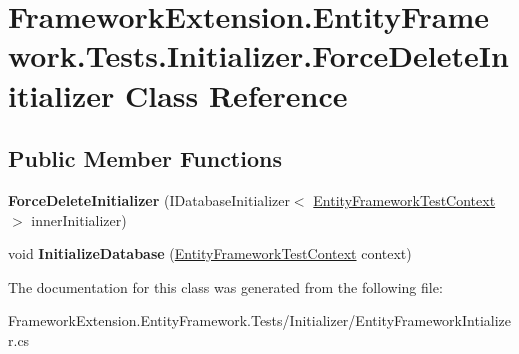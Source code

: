 \hypertarget{class_framework_extension_1_1_entity_framework_1_1_tests_1_1_initializer_1_1_force_delete_initializer}{\section{Framework\-Extension.\-Entity\-Framework.\-Tests.\-Initializer.\-Force\-Delete\-Initializer Class Reference}
\label{class_framework_extension_1_1_entity_framework_1_1_tests_1_1_initializer_1_1_force_delete_initializer}
}
\subsection*{Public Member Functions}
\begin{DoxyCompactItemize}
\item 
\hypertarget{class_framework_extension_1_1_entity_framework_1_1_tests_1_1_initializer_1_1_force_delete_initializer_aaa356804097e887596e42aceee560ec1}{{\bfseries Force\-Delete\-Initializer} (I\-Database\-Initializer$<$ \hyperlink{class_framework_extension_1_1_entity_framework_1_1_tests_1_1_unit_tests_1_1_entity_framework_test_context}{Entity\-Framework\-Test\-Context} $>$ inner\-Initializer)}\label{class_framework_extension_1_1_entity_framework_1_1_tests_1_1_initializer_1_1_force_delete_initializer_aaa356804097e887596e42aceee560ec1}

\item 
\hypertarget{class_framework_extension_1_1_entity_framework_1_1_tests_1_1_initializer_1_1_force_delete_initializer_a276504ce4d33743ff35377c971af3dce}{void {\bfseries Initialize\-Database} (\hyperlink{class_framework_extension_1_1_entity_framework_1_1_tests_1_1_unit_tests_1_1_entity_framework_test_context}{Entity\-Framework\-Test\-Context} context)}\label{class_framework_extension_1_1_entity_framework_1_1_tests_1_1_initializer_1_1_force_delete_initializer_a276504ce4d33743ff35377c971af3dce}

\end{DoxyCompactItemize}


The documentation for this class was generated from the following file\-:\begin{DoxyCompactItemize}
\item 
Framework\-Extension.\-Entity\-Framework.\-Tests/\-Initializer/Entity\-Framework\-Intializer.\-cs\end{DoxyCompactItemize}
